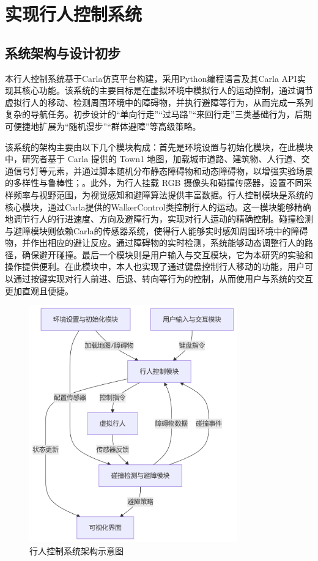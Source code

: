 \chapter{实现行人控制系统}

\section{系统架构与设计初步}
本行人控制系统基于Carla仿真平台构建，采用Python编程语言及其Carla API实现其核心功能。该系统的主要目标是在虚拟环境中模拟行人的运动控制，通过调节虚拟行人的移动、检测周围环境中的障碍物，并执行避障等行为，从而完成一系列复杂的导航任务。初步设计的“单向行走”“过马路”“来回行走”三类基础行为，后期可便捷地扩展为“随机漫步”“群体避障”等高级策略。

该系统的架构主要由以下几个模块构成：首先是环境设置与初始化模块，在此模块中，研究者基于 Carla 提供的 Town1 地图，加载城市道路、建筑物、人行道、交通信号灯等元素，并通过脚本随机分布静态障碍物和动态障碍物，以增强实验场景的多样性与鲁棒性；。此外，为行人挂载 RGB 摄像头和碰撞传感器，设置不同采样频率与视野范围，为视觉感知和避障算法提供丰富数据。行人控制模块是系统的核心模块，通过Carla提供的WalkerControl类控制行人的运动。这一模块能够精确地调节行人的行进速度、方向及避障行为，实现对行人运动的精确控制。碰撞检测与避障模块则依赖Carla的传感器系统，使得行人能够实时感知周围环境中的障碍物，并作出相应的避让反应。通过障碍物的实时检测，系统能够动态调整行人的路径，确保避开碰撞。最后一个模块则是用户输入与交互模块，它为本研究的实验和操作提供便利。在此模块中，本人也实现了通过键盘控制行人移动的功能，用户可以通过按键实现对行人前进、后退、转向等行为的控制，从而使用户与系统的交互更加直观且便捷。

\begin{figure}[hbt]
    \centering
    \includegraphics[width=0.8\textwidth]{images/system_architecture.png}
    \caption{行人控制系统架构示意图}
    \label{f.system_architecture}
\end{figure}

